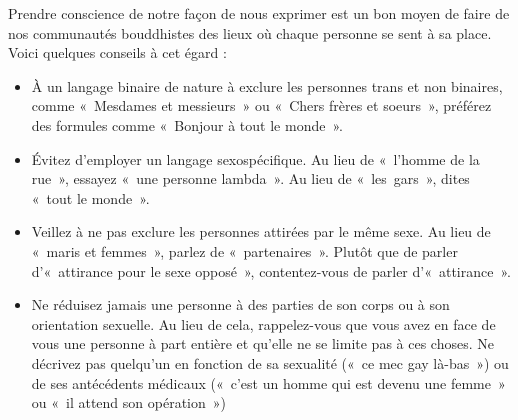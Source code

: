 \documentclass[12pt,openany]{book}
\begin{document}
\noindent Prendre conscience de notre façon de nous exprimer est un bon moyen de faire de nos communautés bouddhistes des lieux où chaque personne se sent à sa place. Voici quelques conseils à cet égard :

\begin{itemize}[label=\textbullet]
\setlength\itemsep{-0.3em}
\item À un langage binaire de nature à exclure les personnes trans et non binaires, comme \mbox{« M}esdames et messieur\mbox{s »} ou \mbox{« C}hers frères et soeur\mbox{s »}, préférez des formules comme \mbox{« B}onjour à tout le mond\mbox{e »}.
\item Évitez d’employer un langage sexospécifique. Au lieu de \mbox{« l}’homme de la ru\mbox{e »}, essayez \mbox{« u}ne personne lambd\mbox{a »}. Au lieu de \mbox{« les gars »}, dites \mbox{« t}out le mond\mbox{e »}.
\item Veillez à ne pas exclure les personnes attirées par le même sexe. Au lieu de \mbox{« m}aris et femme\mbox{s »}, parlez de \mbox{« partenaires »}. Plutôt que de parler d’\mbox{« a}ttirance pour le sexe oppos\mbox{é »}, contentez-vous de parler d’\mbox{« attirance »}.
\item Ne réduisez jamais une personne à des parties de son corps ou à son orientation sexuelle. Au lieu de cela, rappelez-vous que vous avez en face de vous une personne à part entière et qu’elle ne se limite pas à ces choses. Ne décrivez pas quelqu’un en fonction de sa sexualité (\mbox{« c}e mec gay là-ba\mbox{s »}) ou de ses antécédents médicaux (\mbox{« c}’est un homme qui est devenu une femm\mbox{e »} ou \mbox{« i}l attend son opératio\mbox{n »})
\end{itemize}

\begin{figure}[h]
    \centering
\end{figure}
\end{document}
